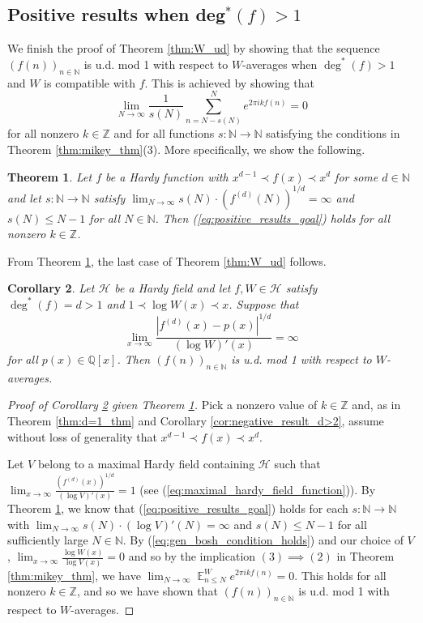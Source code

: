 \documentclass[12pt]{article}
\theoremstyle{plain} %
\newtheorem{theorem}{Theorem}[section]
\newtheorem{corollary}[theorem]{Corollary}
\theoremstyle{definition} %
\theoremstyle{plain}
\theoremstyle{plain}
\numberwithin{equation}{section}
\newcommand{\N}{\mathbb{N}}
\newcommand{\Z}{\mathbb{Z}}
\newcommand{\Q}{\mathbb{Q}}
\renewcommand{\leq}{\leqslant}
\newcommand{\1}{\mathbbm{1}}
\newcommand{\E}{\operatorname{\mathbb{E}}}
\newcommand{\oo}{\infty}
\begin{document}
\subsection{Positive results when deg\texorpdfstring{$^*(f)>1$}{*(f)>1}}


We finish the proof of Theorem \ref{thm:W_ud} by showing that the sequence $(f(n))_{n\in \N}$ is u.d. mod 1 with respect to $W$-averages when $\deg^*(f)>1$ and $W$ is compatible with $f$. This is achieved by showing that 
\begin{equation}\label{eq:positive_results_goal}
    \lim_{N\to\oo}\frac{1}{s(N)}\sum_{n=N-s(N)}^Ne^{2\pi i kf(n)}=0
\end{equation}
 for all nonzero $k\in \Z$ and for all functions $s:\N\rightarrow \N$ satisfying the conditions in Theorem \ref{thm:mikey_thm}(3). More specifically, we show the following.

\begin{theorem}\label{thm:d>1_positive_thm}
    Let $f$ be a Hardy function with $x^{d-1}\prec f(x)\prec x^d$ for some $d\in \N$ and let $s:\N\rightarrow \N$ satisfy 
    $\lim_{N\to\oo}s(N)\cdot (f^{(d)}(N))^{1/d}=\oo$ and $s(N)\leq N-1$ for all $N\in\N$. Then (\ref{eq:positive_results_goal}) holds for all nonzero $k\in \Z$.
\end{theorem}
From Theorem \ref{thm:d>1_positive_thm}, the last case of Theorem \ref{thm:W_ud} follows.


\begin{corollary}\label{cor:positive_result_d>2}
   Let $\mathcal{H}$ be a Hardy field and let $f,W\in \mathcal{H}$ satisfy $\deg^*(f)=d>1$ and  $1\prec \log W(x)\prec x$. Suppose that
\begin{equation}\label{eq:gen_bosh_condition_holds}
         \lim_{x\to\oo}\frac{|f^{(d)}(x)-p(x)|^{1/d}}{(\log W)'(x)}=\oo
 \end{equation}
for all $p(x)\in \Q[x]$. Then $(f(n))_{n\in \N}$ is  u.d. mod 1 with respect to $W$-averages. 
\end{corollary}
\begin{proof}[Proof of Corollary \ref{cor:positive_result_d>2} given Theorem \ref{thm:d>1_positive_thm}]
    Pick a nonzero value of $k\in \Z$ and, as in Theorem \ref{thm:d=1_thm} and Corollary \ref{cor:negative_result_d>2}, assume without loss of generality that $x^{d-1}\prec f(x)\prec x^d$.
    
    
    Let $V$ belong to a maximal Hardy field containing $\mathcal{H}$ such that $\lim_{x\to\oo}\frac{(f^{(d)}(x))^{1/d}}{(\log V)'(x)}=1$ (see (\ref{eq:maximal_hardy_field_function})). By Theorem \ref{thm:d>1_positive_thm}, we know that (\ref{eq:positive_results_goal}) holds for each $s:\N\rightarrow \N$ with $\lim_{N\to\oo}s(N)\cdot (\log V)'(N) = \oo$ and $s(N)\leq N-1$ for all sufficiently large $N\in \N$. By (\ref{eq:gen_bosh_condition_holds}) and our choice of $V$, $\lim_{x\to\oo}\frac{\log W(x)}{\log V(x)}=0$ and so by the implication $(3)\implies(2)$ in Theorem \ref{thm:mikey_thm}, we have $\lim_{N\to\oo}\E_{n\leq N}^We^{2\pi i k f(n)}=0$. This holds for all nonzero $k\in \Z$, and so we have shown that $(f(n))_{n\in \N}$ is u.d. mod 1 with respect to $W$-averages.
\end{proof}
\end{document}
